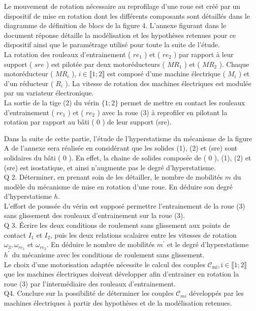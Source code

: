 \documentclass[10pt]{article}
\begin{document}
Le mouvement de rotation nécessaire au reprofilage d'une roue est créé par un dispositif de mise en rotation dont les différents composants sont détaillés dans le diagramme de définition de blocs de la figure 4. L'annexe figurant dans le document réponse détaille la modélisation et les hypothèses retenues pour ce dispositif ainsi que le paramétrage utilisé pour toute la suite de l'étude.\\
La rotation des rouleaux d'entrainement ( $r e_{1}$ ) et ( $r e_{2}$ ) par rapport à leur support ( $s r e$ ) est pilotée par deux motoréducteurs ( $M R_{1}$ ) et ( $M R_{2}$ ). Chaque motoréducteur ( $M R_{i}$ ), $i \in \llbracket 1 ; 2 \rrbracket$ est composé d'une machine électrique ( $M_{i}$ ) et d'un réducteur ( $R_{i}$ ). La vitesse de rotation des machines électriques est modulée par un variateur électronique.\\
La sortie de la tige (2) du vérin $\{1 ; 2\}$ permet de mettre en contact les rouleaux d'entrainement ( $r e_{1}$ ) et ( $r e_{2}$ ) avec la roue (3) à reprofiler en pilotant la rotation par rapport au bâti ( 0 ) de leur support (sre).

Dans la suite de cette partie, l'étude de l'hyperstatisme du mécanisme de la figure A de l'annexe sera réalisée en considérant que les solides (1), (2) et (sre) sont solidaires du bâti ( 0 ). En effet, la chaine de solides composée de ( 0 ), (1), (2) et (sre) est isostatique, et ainsi n'augmente pas le degré d'hyperstatisme.\\
Q 2. Déterminer, en prenant soin de les détailler, le nombre de mobilités $m$ du modèle du mécanisme de mise en rotation d'une roue. En déduire son degré d'hyperstatisme $h$.\\
L'effort de poussée du vérin est supposé permettre l'entrainement de la roue (3) sans glissement des rouleaux d'entrainement sur la roue (3).\\
Q 3. Écrire les deux conditions de roulement sans glissement aux points de contact $I_{1}$ et $I_{2}$, puis les deux relations scalaires entre les vitesses de rotation $\omega_{3}, \omega_{r e_{1}}$ et $\omega_{r e_{2}}$. En déduire le nombre de mobilités $m^{\prime}$ et le degré d'hyperstatisme $h^{\prime}$ du mécanisme avec les conditions de roulement sans glissement.\\
Le choix d'une motorisation adaptée nécessite le calcul des couples $\mathcal{C}_{\mathrm{mi}}, \mathrm{i} \in \llbracket 1 ; 2 \rrbracket$ que les machines électriques doivent développer afin d'entrainer en rotation la roue (3) par l'intermédiaire des rouleaux d'entrainement.\\
Q4. Conclure sur la possibilité de déterminer les couples $\mathcal{C}_{m i}$ développés par les machines électriques à partir des hypothèses et de la modélisation retenues.
\end{document}
